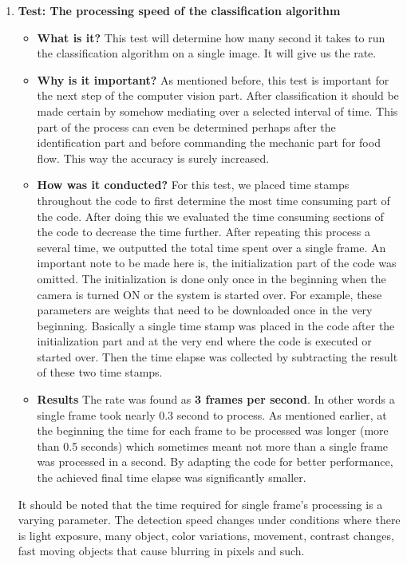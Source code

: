 \begin{enumerate}
\item \textbf{Test: The processing speed of the classification algorithm}
\begin{itemize}
    \item \textbf{What is it?} This test will determine how many second it takes to run the classification algorithm on a single image. It will give us the rate.
    \item \textbf{Why is it important?} As mentioned before, this test is important for the next step of the computer vision part. After classification it should be made certain by somehow mediating over a selected interval of time. This part of the process can even be determined perhaps after the identification part and before commanding the mechanic part for food flow. This way the accuracy is surely increased. 
    \item \textbf{How was it conducted?} For this test, we placed time stamps throughout the code to first determine the most time consuming part of the code. After doing this we evaluated the time consuming sections of the code to decrease the time further. After repeating this process a several time, we outputted the total time spent over a single frame. An important note to be made here is, the initialization part of the code was omitted. The initialization is done only once in the beginning when the camera is turned ON or the system is started over. For example, these parameters are weights that need to be downloaded once in the very beginning. Basically a single time stamp was placed in the code after the initialization part and at the very end where the code is executed or started over. Then the time elapse was collected by subtracting the result of these two time stamps.
    \item \textbf{Results} The rate was found as \textbf{3 frames per second}. In other words a single frame took nearly 0.3 second to process. As mentioned earlier, at the beginning the time for each frame to be processed was longer (more than 0.5 seconds) which sometimes meant not more than a single frame was processed in a second. By adapting the code for better performance, the achieved final time elapse was significantly smaller. 
\end{itemize}

It should be noted that the time required for single frame's processing is a varying parameter. The detection speed changes under conditions where there is light exposure, many object, color variations, movement, contrast changes, fast moving objects that cause blurring in pixels and such.  


\end{enumerate}
